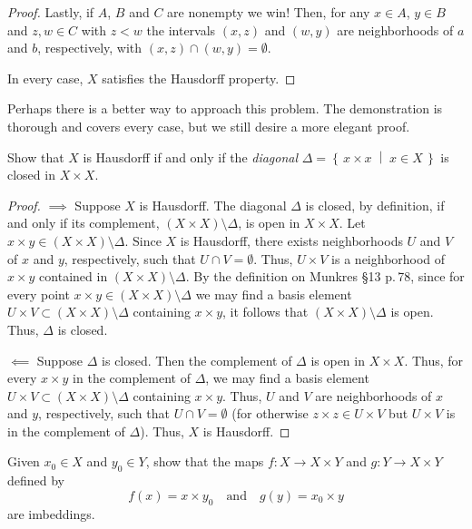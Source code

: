 \begin{proof}
Lastly, if $A$, $B$ and $C$ are nonempty we win! Then, for any
$x\in A$, $y\in B$ and $z,w\in C$ with $z<w$ the intervals
$(x,z)$ and $(w,y)$ are neighborhoods of $a$ and $b$,
respectively, with $(x,z)\cap (w,y)=\emptyset$.

In every case, $X$ satisfies the Hausdorff property.
\end{proof}
\begin{remarks*}
Perhaps there is a better way to approach this problem. The
demonstration is thorough and covers every case, but we still
desire a more elegant proof.
\end{remarks*}
\newpage
\begin{problem}[Munkres \S17, p.\,101, 13]
Show that $X$ is Hausdorff if and only if the \emph{diagonal}
$\Delta=\left\{\,x\times x\;\middle|\;x\in X\,\right\}$ is closed
in $X\times X$.
\end{problem}
\begin{proof}
$\implies$ Suppose $X$ is Hausdorff. The diagonal $\Delta$ is
closed, by definition, if and only if its complement, $(X\times
X)\setminus\Delta$, is open in $X\times X$. Let $x\times
y\in(X\times X)\setminus\Delta$. Since $X$ is Hausdorff, there
exists neighborhoods $U$ and $V$ of $x$ and $y$, respectively,
such that $U\cap V=\emptyset$. Thus, $U\times V$ is a
neighborhood of $x\times y$ contained in $(X\times X)\setminus
\Delta$. By the definition on Munkres \S13 p.\,78, since for
every point $x\times y\in(X\times X)\setminus\Delta$ we may find
a basis element $U\times V\subset (X\times X)\setminus\Delta$
containing $x\times y$, it follows that $(X\times
X)\setminus\Delta$ is open. Thus, $\Delta$ is closed.

$\impliedby$ Suppose $\Delta$ is closed. Then the complement
of $\Delta$ is open in $X\times X$. Thus, for every $x\times y$
in the complement of $\Delta$, we may find a basis element
$U\times V\subset(X\times X)\setminus\Delta$ containing $x\times
y$. Thus, $U$ and $V$ are neighborhoods of $x$ and $y$,
respectively, such that $U\cap V=\emptyset$ (for otherwise
$z\times z\in U\times V$ but $U\times V$ is in the complement of
$\Delta$). Thus, $X$ is Hausdorff.
\end{proof}
\newpage
\begin{problem}[Munkres \S18, p.\,111, 4]
Given $x_0\in X$ and $y_0\in Y$, show that the maps $f\colon X\to
X\times Y$ and $g\colon Y\to X\times Y$ defined by
\[
f(x)=x\times y_0\quad\text{and}\quad g(y)=x_0\times y
\]
are imbeddings.
\end{problem}
